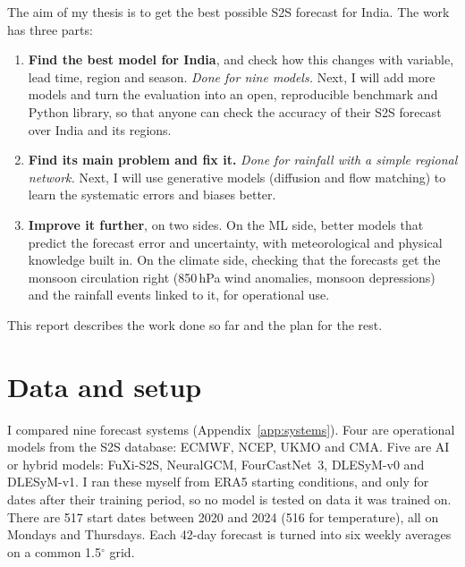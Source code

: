 \documentclass[11pt,a4paper]{article}
\begin{document}
The aim of my thesis is to get the best possible S2S forecast for India. The work has three parts:
\begin{enumerate}
\item \textbf{Find the best model for India}, and check how this changes with variable, lead time, region and season.
\textit{Done for nine models.} Next, I will add more models and turn the evaluation into an open, reproducible benchmark and
Python library, so that anyone can check the accuracy of their S2S forecast over India and its regions.
\item \textbf{Find its main problem and fix it.} \textit{Done for rainfall with a simple regional network.} Next, I will use
generative models (diffusion and flow matching) to learn the systematic errors and biases better.
\item \textbf{Improve it further}, on two sides. On the ML side, better models that predict the forecast error and uncertainty,
with meteorological and physical knowledge built in. On the climate side, checking that the forecasts get the monsoon circulation
right (850\,hPa wind anomalies, monsoon depressions) and the rainfall events linked to it, for operational use.
\end{enumerate}
This report describes the work done so far and the plan for the rest.

\section{Data and setup}
I compared nine forecast systems (Appendix~\ref{app:systems}). Four are operational models from the S2S database: ECMWF, NCEP,
UKMO and CMA. Five are AI or hybrid models: FuXi-S2S, NeuralGCM, FourCastNet~3, DLESyM-v0 and DLESyM-v1. I ran these myself from
ERA5 starting conditions, and only for dates after their training period, so no model is tested on data it was trained on. There
are 517 start dates between 2020 and 2024 (516 for temperature), all on Mondays and Thursdays. Each 42-day forecast is turned into
six weekly averages on a common 1.5$^\circ$ grid.
\end{document}
